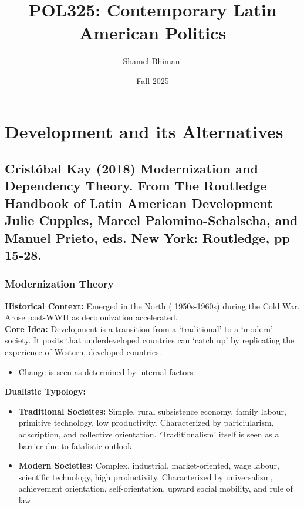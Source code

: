 \documentclass{article}
\title{POL325: Contemporary Latin American Politics}
\author{Shamel Bhimani}
\date{Fall 2025}
\begin{document}
\maketitle

\tableofcontents
\newpage

\section{Development and its Alternatives}
    \subsection{Cristóbal Kay (2018) Modernization and Dependency Theory. From The Routledge Handbook of Latin American Development Julie Cupples, Marcel Palomino-Schalscha, and Manuel Prieto, eds. New York: Routledge, pp 15-28.}
    \subsubsection{Modernization Theory}
    \noindent \textbf{Historical Context:} Emerged in the North (
1950s-1960s) during the Cold War. Arose post-WWII as decolonization
accelerated.\\

    \noindent \textbf{Core Idea:} Development is a transition from a
`traditional' to a `modern' society. It posits that underdeveloped countries
can `catch up' by replicating the experience of Western, developed countries.
    \begin{itemize}
        \item Change is seen as determined by internal factors
    \end{itemize}

    \noindent \textbf{Dualistic Typology:}
    \begin{itemize}
        \item \textbf{Traditional Socieites:} Simple, rural subsistence
        economy, family labour, primitive technology, low productivity.
        Characterized by partciularism, adscription, and collective
        orientation. `Traditionalism' itself is seen as a barrier due to
        fatalistic outlook.
        \item \textbf{Modern Societies:} Complex, industrial,
        market-oriented, wage labour, scientific technology, high
        productivity. Characterized by universalism, achievement
        orientation, self-orientation, upward social mobility, and rule of law.
    \end{itemize}
\end{document}

